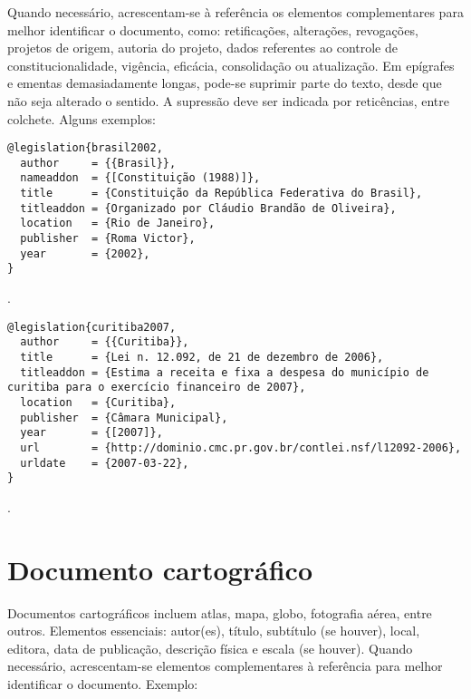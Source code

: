Quando necessário, acrescentam-se à referência os elementos complementares para melhor identificar o documento, como: retificações, alterações, revogações, projetos de origem,
autoria do projeto, dados referentes ao controle de constitucionalidade, vigência, eficácia, consolidação ou atualização.
Em epígrafes e ementas demasiadamente longas, pode-se suprimir parte do texto, desde que não seja alterado o sentido. A supressão deve ser indicada por reticências, entre colchete.
Alguns exemplos:

\vspace*{1em}

\begin{verbatim}
@legislation{brasil2002,
  author     = {{Brasil}},
  nameaddon  = {[Constituição (1988)]},
  title      = {Constituição da República Federativa do Brasil},
  titleaddon = {Organizado por Cláudio Brandão de Oliveira},
  location   = {Rio de Janeiro},
  publisher  = {Roma Victor},
  year       = {2002},
}
\end{verbatim}

\noindent
{}.

\vspace*{1em}

\begin{verbatim}
@legislation{curitiba2007,
  author     = {{Curitiba}},
  title      = {Lei n. 12.092, de 21 de dezembro de 2006},
  titleaddon = {Estima a receita e fixa a despesa do município de curitiba para o exercício financeiro de 2007},
  location   = {Curitiba},
  publisher  = {Câmara Municipal},
  year       = {[2007]},
  url        = {http://dominio.cmc.pr.gov.br/contlei.nsf/l12092-2006},
  urldate    = {2007-03-22},
}
\end{verbatim}

\noindent
{}.

\section{Documento cartográfico}

Documentos cartográficos incluem atlas, mapa, globo, fotografia aérea, entre outros.
Elementos essenciais: autor(es), título, subtítulo (se houver), local, editora, data de publicação, descrição física e escala (se houver). Quando necessário, acrescentam-se elementos complementares à referência para melhor identificar o documento.
Exemplo:

\vspace*{1em}

